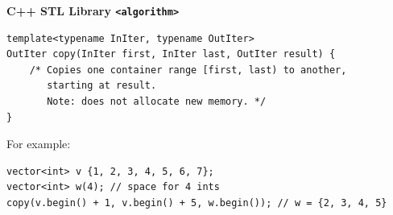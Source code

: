 \documentclass[11pt]{article}
\theoremstyle{definition}
\begin{document}
{\bf C++ STL Library {\tt <algorithm>}}
\begin{lstlisting}
template<typename InIter, typename OutIter>
OutIter copy(InIter first, InIter last, OutIter result) {
    /* Copies one container range [first, last) to another,
       starting at result. 
       Note: does not allocate new memory. */
}
\end{lstlisting}\vspace{-1.5ex}
For example:
\begin{lstlisting}
vector<int> v {1, 2, 3, 4, 5, 6, 7};
vector<int> w(4); // space for 4 ints
copy(v.begin() + 1, v.begin() + 5, w.begin()); // w = {2, 3, 4, 5}
\end{lstlisting}
\end{document}
